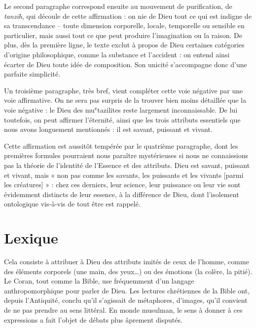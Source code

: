  

 

Le second paragraphe correspond ensuite au mouvement de purification, de
\emph{tanzīh}, qui découle de cette affirmation : on nie de Dieu tout ce
qui est indigne de sa transcendance -- toute dimension corporelle, locale, temporelle ou sensible en
particulier, mais aussi tout ce que peut produire l'imagination ou la
raison. De plus, dès la première ligne, le texte exclut à propos de Dieu
certaines catégories d'origine philosophique, comme la substance et
l'accident : on entend ainsi écarter de Dieu toute idée de composition.
Son unicité s'accompagne donc d'une parfaite simplicité.

Un troisième paragraphe, très bref, vient compléter cette voie négative
par une voie affirmative. On ne sera pas surpris de la trouver bien
moins détaillée que la voie négative : le Dieu des muʿtazilites reste
largement inconnaissable. De lui toutefois, on peut affirmer l'éternité,
ainsi que les trois attributs essentiels que nous avons longuement
mentionnés : il est savant, puissant et vivant.

Cette affirmation est aussitôt tempérée par le quatrième paragraphe,
dont les premières formules pourraient nous paraître mystérieuses si
nous ne connaissions pas la théorie de l'identité de l'Essence et des
attributs. Dieu est savant, puissant et vivant, mais
« non pas comme les savants, les puissants et les vivants {[}parmi les
créatures{]} » : chez ces derniers, leur science, leur puissance ou leur
vie sont évidemment distincts de leur essence, à la différence de Dieu,
dont l'isolement ontologique vis-à-vis de tout être est rappelé.

\section{Lexique}
\begin{Def}[Anthropomorphisme]
Cela consiste à attribuer à Dieu des
attributs imités de ceux de l'homme, comme des éléments corporels (une
main, des yeux\ldots) ou des émotions (la colère, la pitié). Le Coran,
tout comme la Bible, use fréquemment d'un langage anthropomorphique pour
parler de Dieu. Les lectures chrétiennes de la Bible ont, depuis
l'Antiquité, conclu qu'il s'agissait de métaphores, d'images, qu'il
convient de ne pas prendre au sens littéral. En monde musulman, le sens
à donner à ces expressions a fait l'objet de débats plus âprement
disputés.
\end{Def}


